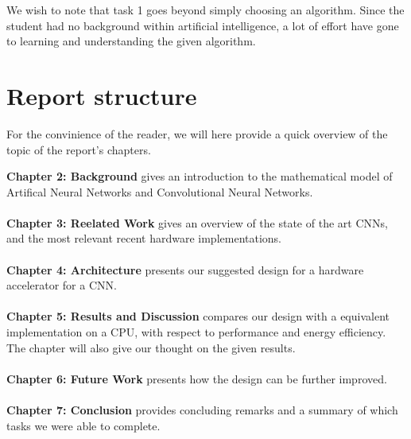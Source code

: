 We wish to note that task 1 goes beyond simply choosing an algorithm. Since the student had no background within artificial intelligence, a lot of effort have gone to learning and understanding the given algorithm. 


\section{Report structure}

For the convinience of the reader, we will here provide a quick overview of the topic of the report's chapters. 

\textbf{Chapter 2: Background} gives an introduction to the mathematical model of Artifical Neural Networks and Convolutional Neural Networks. \\ \hfil \\ \hfil
\textbf{Chapter 3: Reelated Work} gives an overview of the state of the art CNNs, and the most relevant recent hardware implementations. \\ \hfil \\ \hfil
\textbf{Chapter 4: Architecture} presents our suggested design for a hardware accelerator for a CNN.  \\ \hfil \\ \hfil
\textbf{Chapter 5: Results and Discussion} compares our design with a equivalent implementation on a CPU, with respect to performance and energy efficiency. The chapter will also give our thought on the given results.  \\ \hfil \\ \hfil
\textbf{Chapter 6: Future Work} presents how the design can be further improved. \\ \hfil \\ \hfil
\textbf{Chapter 7: Conclusion} provides concluding remarks and a summary of which tasks we were able to complete.\\ \hfil \\ \hfil



